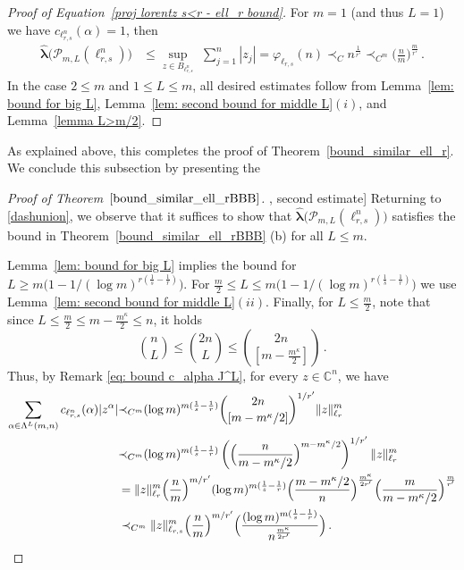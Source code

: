 \documentclass[12pt]{amsart}
\numberwithin{subsection}{section}
\theoremstyle{definition}
\theoremstyle{remark}
\begin{document}
\begin{proof}[Proof of Equation~\eqref{proj lorentz s<r - ell_r bound}]
For $m = 1$ (and thus $L=1$) we have $ c_{\ell_{r,s}^n}(\alpha) = 1$, then
\begin{align*}
\widehat{\boldsymbol{\lambda}}\big(\mathcal P_{m,L}(\ell_{r,s}^n)\big)
& \le \sup_{z\in B_{\ell_{r,s}^n}}\,\,\sum_{j = 1}^n  |z_j | = \varphi_{\ell_{r,s}}(n) \prec_{C} n^{\frac1{r'}} \prec_{C^m} \Big(\frac{n}{m}\Big)^{\frac{m}{r'}}\,.
\end{align*}
In the  case $2 \leq m$ and $1 \leq L \leq m$, all desired estimates follow from  Lemma~\ref{lem: bound for big L},
Lemma~\ref{lem: second bound for middle L}$(i)$, and Lemma~\ref{lemma L>m/2}.
\end{proof}
As explained above, this completes the proof of Theorem~\ref{bound_similar_ell_r}. We conclude this subsection by presenting the

\begin{proof}[Proof of Theorem~$\ref{bound_similar_ell_rBBB}$], second estimate] Returning to \eqref{dashunion}, we observe that
it suffices to show that $\widehat{\boldsymbol{\lambda}}\big(\mathcal{P}_{m,L}(\ell_{r,s}^n)\big)$ satisfies the bound in
Theorem~\ref{bound_similar_ell_rBBB} (b) for all $L \le m$.

Lemma~\ref{lem: bound for big L} implies the bound for $L\ge m\big(1-1/(\log m)^{r(\frac1{s}-\frac1{r})}\big)$. For
$\frac{m}{2}\le L\le m\big(1-1/(\log m)^{r(\frac1{s}-\frac1{r})}\big)$ we use Lemma~\ref{lem: second bound for middle L}$(ii)$.
Finally, for  $L\le \frac{m}{2}$, note that since $L\le \frac{m}{2}\le m-\frac{m^\kappa}{2}\le n$, it holds
\[
\binom{n}{L} \le \binom{2n}{L} \le \binom{2n}{[m-\frac{m^\kappa}{2}]}\,.
\]
Thus, by Remark \ref{eq: bound c_alpha J^L}, for every $z \in \mathbb{C}^n$, we have
\begin{align*}
\sum_{\alpha \in \Lambda^{L}(m,n)} c_{\ell_{r,s}^n}(\alpha)  |z^\alpha|
& {\prec_{C^m}} (\log m)^{m(\frac1{s}-\frac1{r})}  \binom{2n}{[m-m^\kappa/2]}^{1/r'}  \|z\|_{\ell_r}^{m}\nonumber
\\
& {\prec_{C^m}} (\log m)^{m(\frac1{s}-\frac1{r})} \left( \Big(\frac{n}{m-m^\kappa/2}\Big)^{m-m^\kappa/2} \right)^{1/r'}  \|z\|_{\ell_r}^{m}\nonumber
\\
&=\|z\|_{\ell_r}^{m}\Big(\frac{n}{m}\Big)^{m/r'}(\log m)^{m(\frac1{s}-\frac1{r})}\Big(\frac{m-m^\kappa/2}{n}\Big)^{\frac{m^\kappa}{2r'}}
\Big(\frac{m}{m-m^\kappa/2}\Big)^{\frac{m}{r'}}\nonumber
\\
& \prec_{C^m} \|z\|_{\ell_{r,s}}^{m}\Big(\frac{n}{m}\Big)^{m/r'}\Big(\frac{(\log m)^{m(\frac1{s}-\frac1{r})}}{n^{\frac{m^\kappa}{2r'}}}\Big)\,.\nonumber \qedhere
\end{align*}
\end{proof}
\end{document}
